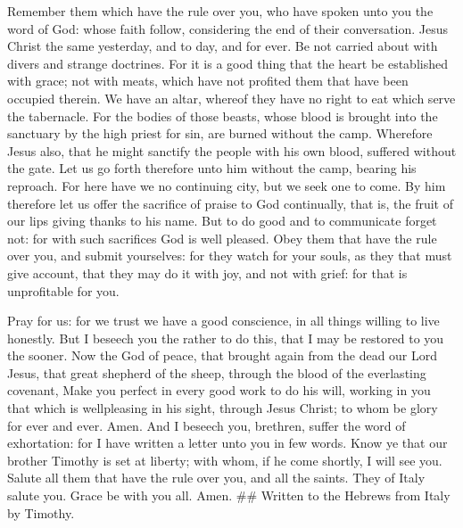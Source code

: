  Remember them which have the rule over you, who have spoken
unto you the word of God: whose faith follow, considering the end of
their conversation.  Jesus Christ the same yesterday, and to
day, and for ever.  Be not carried about with divers and
strange doctrines. For it is a good thing that the heart be established
with grace; not with meats, which have not profited them that have been
occupied therein.  We have an altar, whereof they have no
right to eat which serve the tabernacle.  For the bodies of
those beasts, whose blood is brought into the sanctuary by the high
priest for sin, are burned without the camp.  Wherefore
Jesus also, that he might sanctify the people with his own blood,
suffered without the gate.  Let us go forth therefore unto
him without the camp, bearing his reproach.  For here have
we no continuing city, but we seek one to come.  By him
therefore let us offer the sacrifice of praise to God continually, that
is, the fruit of our lips giving thanks to his name.  But
to do good and to communicate forget not: for with such sacrifices God
is well pleased.  Obey them that have the rule over you,
and submit yourselves: for they watch for your souls, as they that must
give account, that they may do it with joy, and not with grief: for that
is unprofitable for you.

 Pray for us: for we trust we have a good conscience, in
all things willing to live honestly.  But I beseech you the
rather to do this, that I may be restored to you the sooner.
 Now the God of peace, that brought again from the dead our
Lord Jesus, that great shepherd of the sheep, through the blood of the
everlasting covenant,  Make you perfect in every good work
to do his will, working in you that which is wellpleasing in his sight,
through Jesus Christ; to whom be glory for ever and ever. Amen.
 And I beseech you, brethren, suffer the word of
exhortation: for I have written a letter unto you in few words.
 Know ye that our brother Timothy is set at liberty; with
whom, if he come shortly, I will see you.  Salute all them
that have the rule over you, and all the saints. They of Italy salute
you.  Grace be with you all. Amen. \#\# Written to the
Hebrews from Italy by Timothy.
